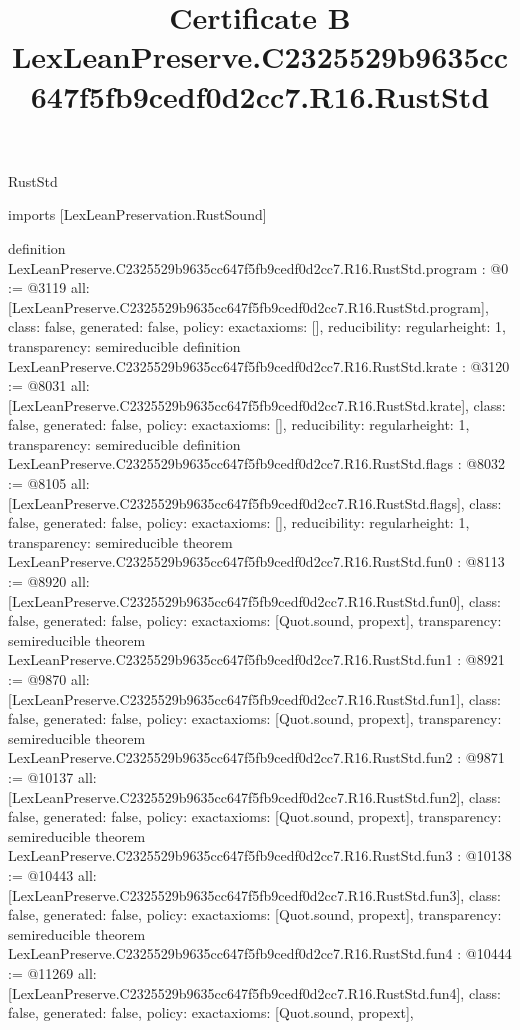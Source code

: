 \begin{lexlean}{RustStd}
\title{Certificate B LexLeanPreserve.C2325529b9635cc647f5fb9cedf0d2cc7.R16.RustStd}
\begin{coremodule}
imports [LexLeanPreservation.RustSound]

definition LexLeanPreserve.C2325529b9635cc647f5fb9cedf0d2cc7.R16.RustStd.program : @0 := @3119 {
  all: [LexLeanPreserve.C2325529b9635cc647f5fb9cedf0d2cc7.R16.RustStd.program],
  class: false,
  generated: false,
  policy: exact{axioms: []},
  reducibility: regular{height: 1},
  transparency: semireducible
}
definition LexLeanPreserve.C2325529b9635cc647f5fb9cedf0d2cc7.R16.RustStd.krate : @3120 := @8031 {
  all: [LexLeanPreserve.C2325529b9635cc647f5fb9cedf0d2cc7.R16.RustStd.krate],
  class: false,
  generated: false,
  policy: exact{axioms: []},
  reducibility: regular{height: 1},
  transparency: semireducible
}
definition LexLeanPreserve.C2325529b9635cc647f5fb9cedf0d2cc7.R16.RustStd.flags : @8032 := @8105 {
  all: [LexLeanPreserve.C2325529b9635cc647f5fb9cedf0d2cc7.R16.RustStd.flags],
  class: false,
  generated: false,
  policy: exact{axioms: []},
  reducibility: regular{height: 1},
  transparency: semireducible
}
theorem LexLeanPreserve.C2325529b9635cc647f5fb9cedf0d2cc7.R16.RustStd.fun0 : @8113 := @8920 {
  all: [LexLeanPreserve.C2325529b9635cc647f5fb9cedf0d2cc7.R16.RustStd.fun0],
  class: false,
  generated: false,
  policy: exact{axioms: [Quot.sound, propext]},
  transparency: semireducible
}
theorem LexLeanPreserve.C2325529b9635cc647f5fb9cedf0d2cc7.R16.RustStd.fun1 : @8921 := @9870 {
  all: [LexLeanPreserve.C2325529b9635cc647f5fb9cedf0d2cc7.R16.RustStd.fun1],
  class: false,
  generated: false,
  policy: exact{axioms: [Quot.sound, propext]},
  transparency: semireducible
}
theorem LexLeanPreserve.C2325529b9635cc647f5fb9cedf0d2cc7.R16.RustStd.fun2 : @9871 := @10137 {
  all: [LexLeanPreserve.C2325529b9635cc647f5fb9cedf0d2cc7.R16.RustStd.fun2],
  class: false,
  generated: false,
  policy: exact{axioms: [Quot.sound, propext]},
  transparency: semireducible
}
theorem LexLeanPreserve.C2325529b9635cc647f5fb9cedf0d2cc7.R16.RustStd.fun3 : @10138 := @10443 {
  all: [LexLeanPreserve.C2325529b9635cc647f5fb9cedf0d2cc7.R16.RustStd.fun3],
  class: false,
  generated: false,
  policy: exact{axioms: [Quot.sound, propext]},
  transparency: semireducible
}
theorem LexLeanPreserve.C2325529b9635cc647f5fb9cedf0d2cc7.R16.RustStd.fun4 : @10444 := @11269 {
  all: [LexLeanPreserve.C2325529b9635cc647f5fb9cedf0d2cc7.R16.RustStd.fun4],
  class: false,
  generated: false,
  policy: exact{axioms: [Quot.sound, propext]},
}
\end{coremodule}
\end{lexlean}
